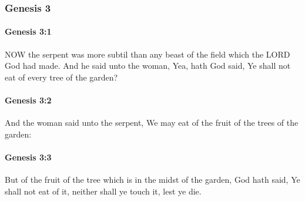 	\subsubsection{Genesis 3} %
		\label{GENESIS-3}
		
		\paragraph{Genesis 3:1} %
			\label{GENESIS-3-1}

			NOW the serpent was more subtil than any beast of the field which the LORD God had made.  And he said unto the woman, Yea, hath God said, Ye shall not eat of every tree of the garden?


		\paragraph{Genesis 3:2} %
			\label{GENESIS-3-2}

			And the woman said unto the serpent, We may eat of the fruit of the trees of the garden:


		\paragraph{Genesis 3:3} %
			\label{GENESIS-3-3}

			But of the fruit of the tree which is in the midst of the garden, God hath said, Ye shall not eat of it, neither shall ye touch it, lest ye die.

